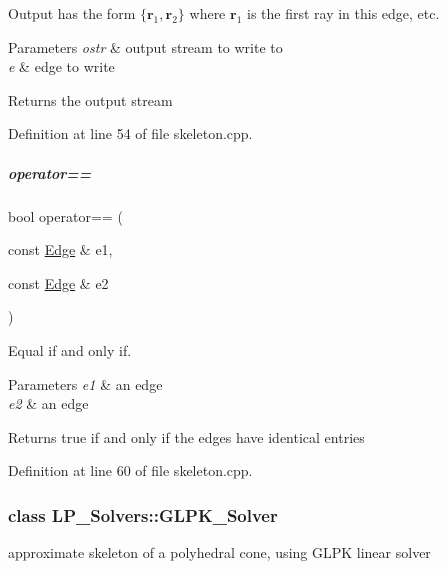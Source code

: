 Output has the form $ \{ \mathbf{r}_1, \mathbf{r}_2 \} $ where $ \mathbf{r}_1 $ is the first ray in this edge, etc. 


\begin{DoxyParams}{Parameters}
{\em ostr} & output stream to write to \\
\hline
{\em e} & edge to write \\
\hline
\end{DoxyParams}
\begin{DoxyReturn}{Returns}
the output stream 
\end{DoxyReturn}


Definition at line 54 of file skeleton.\+cpp.

\mbox{\label{group___c_l_s_solvers_a02f62dc93f3810dedf600e1890d0a01a}} 
\subparagraph{\texorpdfstring{operator==}{operator==}}
{\footnotesize\ttfamily bool operator== (\begin{DoxyParamCaption}\item[{const \hyperlink{group___c_l_s_solvers_class_l_p___solvers_1_1_edge}{Edge} \&}]{e1,  }\item[{const \hyperlink{group___c_l_s_solvers_class_l_p___solvers_1_1_edge}{Edge} \&}]{e2 }\end{DoxyParamCaption})\hspace{0.3cm}{\ttfamily [friend]}}



Equal if and only if. 


\begin{DoxyParams}{Parameters}
{\em e1} & an edge \\
\hline
{\em e2} & an edge \\
\hline
\end{DoxyParams}
\begin{DoxyReturn}{Returns}
{\ttfamily true} if and only if the edges have identical entries 
\end{DoxyReturn}


Definition at line 60 of file skeleton.\+cpp.

\label{class_l_p___solvers_1_1_g_l_p_k___solver}
\subsubsection{class L\+P\+\_\+\+Solvers\+:\+:G\+L\+P\+K\+\_\+\+Solver}
approximate skeleton of a polyhedral cone, using G\+L\+PK linear solver 

